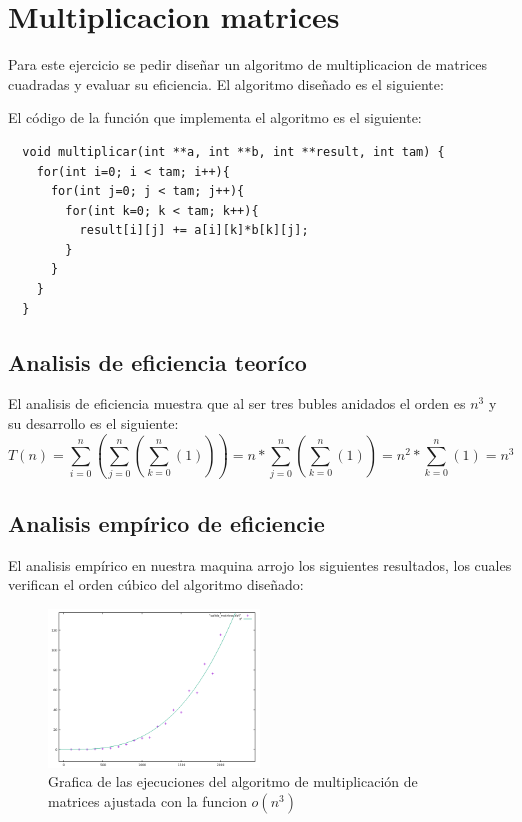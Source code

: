 \section{Multiplicacion matrices}

Para este ejercicio se pedir diseñar un algoritmo de multiplicacion de matrices cuadradas y evaluar su eficiencia. El algoritmo diseñado es el siguiente:

El código de la función que implementa el algoritmo es el siguiente:

\begin{lstlisting}
  void multiplicar(int **a, int **b, int **result, int tam) {
    for(int i=0; i < tam; i++){ 
      for(int j=0; j < tam; j++){
        for(int k=0; k < tam; k++){
          result[i][j] += a[i][k]*b[k][j];
        }
      }
    }
  }
 \end{lstlisting}

\subsection{Analisis de eficiencia teoríco}

El analisis de eficiencia muestra que al ser tres bubles anidados el orden es $n^{3}$ y su desarrollo es el siguiente:
\begin{equation}
T(n)=\sum_{i=0}^{n}(\sum_{j=0}^{n}(\sum_{k=0}^{n}(1)))=n*\sum_{j=0}^{n}(\sum_{k=0}^{n}(1))=n^{2}*\sum_{k=0}^{n}(1)=n^{3}
\end{equation}



\subsection{Analisis empírico de eficiencie}

El analisis empírico en nuestra maquina arrojo los siguientes resultados, los cuales verifican el orden cúbico del algoritmo diseñado:

\begin{figure}[H]
  \centering
  \includegraphics[width=0.5\textwidth]{./Imagenes/mult_matrices_ajustada.png}
  \caption{Grafica de las ejecuciones del algoritmo de multiplicación de matrices ajustada con la funcion $o(n^{3})$}
\end{figure}


